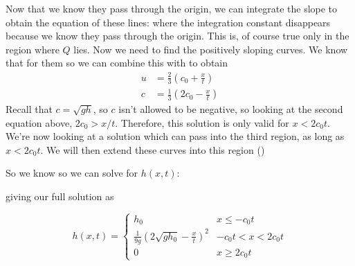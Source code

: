 \documentclass[12pt]{book}
\begin{document}
Now that we know they pass through the origin, we can integrate the slope
to obtain the equation of these lines:
 where the integration constant disappears because we know they pass through the origin.  This is, of course true only in the region where $Q$ lies.  Now we need to find the positively sloping curves.  We know that for them 
so we can combine this with  to obtain
\begin{align*}
u&=\frac{2}{3}\left(c_0 + \frac{x}{t}\right) \\
c &= \frac{1}{3}\left(2c_0 - \frac{x}{t}\right)
\end{align*}
Recall that $c=\sqrt{gh}$, so $c$ isn't allowed to be negative, so looking at the second equation above, $2c_0 > x/t$. Therefore, this solution is only valid for $x<2c_0 t$.  We're now looking at a solution which can pass into the third region, as long as $x < 2c_0 t$.  We will then extend these curves into this region ()

So we know
so we can solve for $h(x,t):$


giving our  full solution as


 \begin{displaymath}
   h(x,t) = \left\{
     \begin{array}{lr}
       h_0 &  x\le-c_0t\\
       \frac{1}{9g}\left(2\sqrt{gh_0} - \frac{x}{t}\right)^2 & -c_0 t < x < 2c_0 t\\
       0 & x\ge 2c_0 t
     \end{array}
   \right.
\end{displaymath} 



\clearpage
\end{document}
